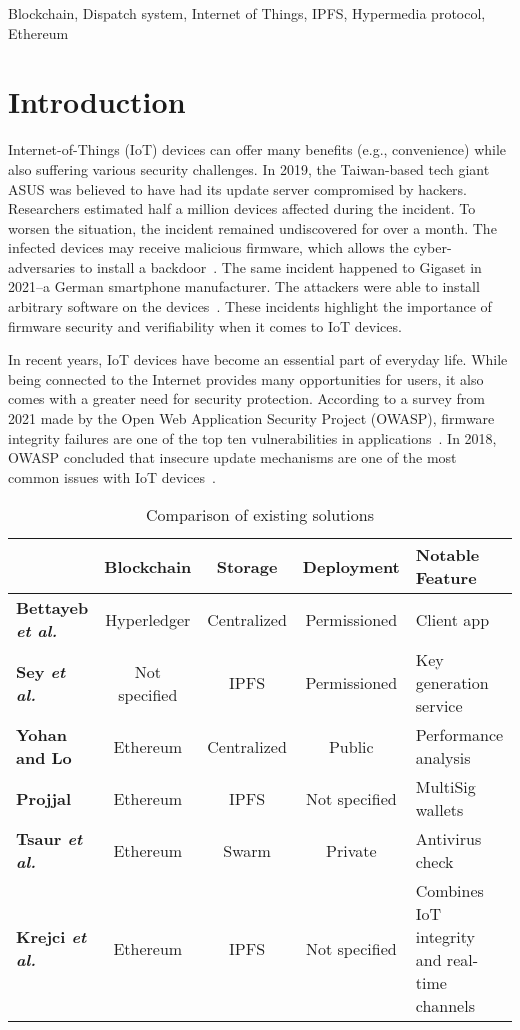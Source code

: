 \documentclass[conference]{IEEEtran}
\begin{document}
\begin{IEEEkeywords}
Blockchain, Dispatch system, Internet of Things, IPFS, Hypermedia protocol, Ethereum
\end{IEEEkeywords}


\section{Introduction}
Internet-of-Things (IoT) devices can offer many benefits (e.g., convenience) while also suffering various security challenges. In 2019, the Taiwan-based tech giant ASUS was believed to have had its update server compromised by hackers. Researchers estimated half a million devices affected during the incident. To worsen the situation, the incident remained undiscovered for over a month. The infected devices may receive malicious firmware, which allows the cyber-adversaries to install a backdoor~\cite{Zetter}. The same incident happened to Gigaset in 2021--a German smartphone manufacturer. The attackers were able to install arbitrary software on the devices~\cite{THN}. These incidents highlight the importance of firmware security and verifiability when it comes to IoT devices.

In recent years, IoT devices have become an essential part of everyday life. While being connected to the Internet provides many opportunities for users, it also comes with a greater need for security protection. According to a survey from 2021 made by the Open Web Application Security Project (OWASP), firmware integrity failures are one of the top ten vulnerabilities in applications~\cite{OWASP1}. In 2018, OWASP concluded that insecure update mechanisms are one of the most common issues with IoT devices~\cite{OWASP2}.

\begin{table*}[t]
\centering
\caption{Comparison of existing solutions}
\label{tab:LiteratureComparison}
\begin{tabular}{@{}lSSSm{4cm}@{}}
&{\textbf{Blockchain}}&{\textbf{Storage}}&{\textbf{Deployment}}&{\textbf{Notable Feature}} \\ \toprule
{\textbf{Bettayeb \emph{et al.}~\cite{Bettayeb2021}}}&{Hyperledger}&{Centralized}&{Permissioned}&{Client app} \\ \midrule
{\textbf{Sey \emph{et al.}~\cite{Sey2021}}}&{Not specified}&{IPFS}&{Permissioned}&{Key generation service} \\ \midrule
{\textbf{Yohan and Lo~\cite{Yohan2020}}}&{Ethereum}&{Centralized}&{Public}&{Performance analysis} \\ \midrule
{\textbf{Projjal \cite{Projjal2020}}}&{Ethereum}&{IPFS}&{Not specified}&{MultiSig wallets} \\ \midrule
{\textbf{Tsaur \emph{et al.}~\cite{Tsaur2020}}}&{Ethereum}&{Swarm}&{Private}&{Antivirus check} \\ \midrule
{\textbf{Krejci \emph{et al.}~\cite{Krejci2020} }}&{Ethereum}&{IPFS}&{Not specified}&{Combines IoT integrity and real-time channels} \\ \bottomrule
\end{tabular}
\vspace{-3mm}
\end{table*}
\end{document}
